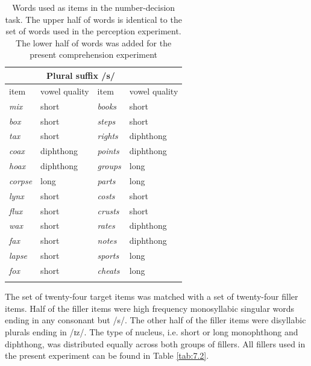 \begin{table}\fontsize{10}{11}
\caption{Words used as items in the number-decision task. The upper half of words is identical to the set of words used in the perception experiment. The lower half of words was added for the present comprehension experiment}
\label{tab:7.1}
\centering
\begin{tabular}{llll}
\lsptoprule
\multicolumn{2}{c}{Non-morphemic /s/} & \multicolumn{2}{c}{Plural suffix /s/}  \\
\midrule
item            & vowel quality       & item            & vowel quality        \\
\midrule
\textit{mix}    & short               & \textit{books}  & short                \\
\textit{box}    & short               & \textit{steps}  & short                \\
\textit{tax}    & short               & \textit{rights} & diphthong            \\
\textit{coax}   & diphthong           & \textit{points} & diphthong            \\
\textit{hoax}   & diphthong           & \textit{groups} & long                 \\
\textit{corpse} & long                & \textit{parts}  & long                 \\
\textit{lynx}   & short               & \textit{costs}  & short                \\
\textit{flux}   & short               & \textit{crusts} & short                \\
\textit{wax}    & short               & \textit{rates}  & diphthong            \\
\textit{fax}    & short               & \textit{notes}  & diphthong            \\
\textit{lapse}  & short               & \textit{sports} & long                 \\
\textit{fox}    & short               & \textit{cheats} & long                \\
\lspbottomrule
\end{tabular}
\end{table}

The set of twenty-four target items was matched with a set of twenty-four filler items. Half of the filler items were high frequency monosyllabic singular words ending in any consonant but /s/. The other half of the filler items were disyllabic plurals ending in /ɪz/. The type of nucleus, i.e. short or long monophthong and diphthong, was distributed equally across both groups of fillers. All fillers used in the present experiment can be found in Table \ref{tab:7.2}.

